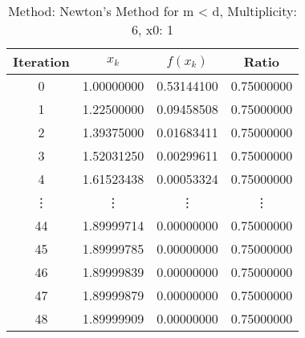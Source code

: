 \begin{table}
\centering
\caption{Method: Newton's Method for m < d, Multiplicity: 6, x0: 1}
\label{tab:table_Newton's_Method_for_m_<_d_6_1}
\begin{tabular}{c c c c}
\toprule
Iteration &      $x_k$ &   $f(x_k)$ &      Ratio \\
\midrule
        0 & 1.00000000 & 0.53144100 & 0.75000000 \\
        1 & 1.22500000 & 0.09458508 & 0.75000000 \\
        2 & 1.39375000 & 0.01683411 & 0.75000000 \\
        3 & 1.52031250 & 0.00299611 & 0.75000000 \\
        4 & 1.61523438 & 0.00053324 & 0.75000000 \\
   \vdots &     \vdots &     \vdots &     \vdots \\
       44 & 1.89999714 & 0.00000000 & 0.75000000 \\
       45 & 1.89999785 & 0.00000000 & 0.75000000 \\
       46 & 1.89999839 & 0.00000000 & 0.75000000 \\
       47 & 1.89999879 & 0.00000000 & 0.75000000 \\
       48 & 1.89999909 & 0.00000000 & 0.75000000 \\
\bottomrule
\end{tabular}
\end{table}
